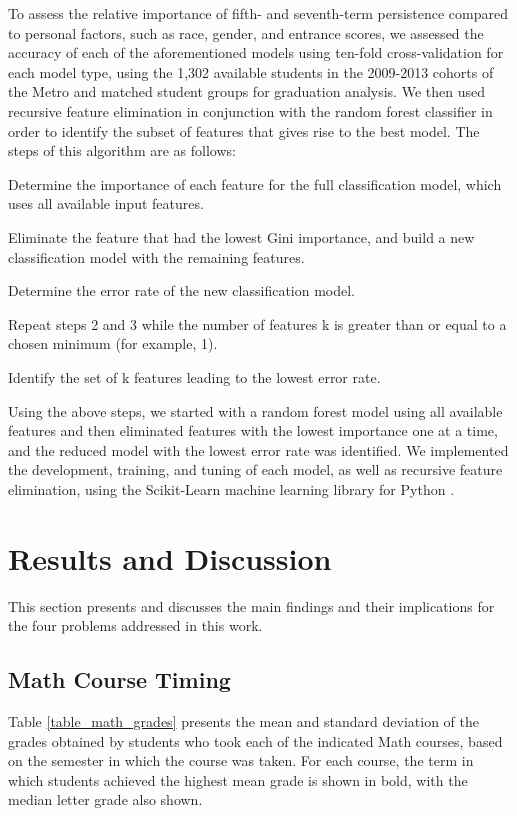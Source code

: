 \documentclass[conference]{IEEEtran}
\begin{document}
To assess the relative importance of fifth- and seventh-term persistence compared to personal factors, such as race, gender, and entrance scores, we assessed the accuracy of each of the aforementioned models using ten-fold cross-validation for each model type, using the 1,302 available students in the 2009-2013 cohorts of the Metro and matched student groups for graduation analysis.  We then used recursive feature elimination \cite{Genuer} in conjunction with the random forest classifier in order to identify the subset of features that gives rise to the best model.  The steps of this algorithm are as follows:
\begin{enumerate}
\begin{small}
  \item Determine the importance of each feature for the full classification model, which uses all available input features.  
  \item Eliminate the feature that had the lowest Gini importance, and build a new classification model with the remaining features.   
  \item Determine the error rate of the new classification model.
  \item Repeat steps 2 and 3 while the number of features k is greater than or equal to a chosen minimum (for example, 1).
  \item Identify the set of k features leading to the lowest error rate.
  \end{small}
\end{enumerate}

Using the above steps, we started with a random forest model using all available features and then eliminated features with the lowest importance one at a time, and the reduced model with the lowest error rate was identified.  We implemented the development, training, and tuning of each model, as well as recursive feature elimination, using the Scikit-Learn machine learning library for Python \cite{scikitlearn}. 

\section{Results and Discussion}

This section presents and discusses the main findings and their implications for the four problems addressed in this work.  

\subsection{Math Course Timing}
Table \ref{table_math_grades} presents the mean and standard deviation of the grades obtained by students who took each of the indicated Math courses, based on the semester in which the course was taken.  For each course, the term in which students achieved the highest mean grade is shown in bold, with the median letter grade also shown.  %
\end{document}
